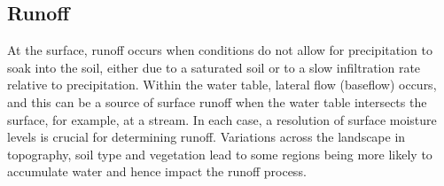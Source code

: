 \documentclass[twoside,10pt]{report}
\begin{document}

\subsection{Runoff}
At the surface, runoff occurs when conditions do not allow for precipitation to soak into the soil, either due to a saturated soil or to a slow infiltration rate relative to precipitation. Within the water table, lateral flow (baseflow) occurs, and this can be a source of surface runoff when the water table intersects the surface, for example, at a stream. In each case, a resolution of surface moisture levels is crucial for determining runoff. Variations across the landscape in topography, soil type and vegetation lead to some regions being more likely to accumulate water and hence impact the runoff process. 
\end{document}
